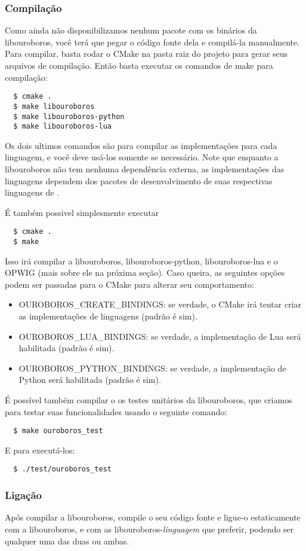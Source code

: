 \subsubsection{Compilação} 
Como ainda não disponibilizamos nenhum pacote
com os binários da libouroboros, você terá que pegar o código fonte dela
e compilá-la manualmente. Para compilar, basta rodar o CMake na pasta 
raiz do projeto para gerar seus arquivos de compilação. Então basta 
executar os comandos de make para compilação:
\begin{verbatim}
  $ cmake .
  $ make libouroboros
  $ make libouroboros-python
  $ make libouroboros-lua
\end{verbatim}
Os dois ultimos comandos são para compilar as implementações para cada linguagem,
e você deve usá-los somente se necessário. Note que enquanto a libouroboros não
tem nenhuma dependência externa, as implementações das linguagens dependem dos
pacotes de desenvolvimento de suas respectivas linguagens de \script{}.

É também possivel simplesmente executar
\begin{verbatim}
  $ cmake .
  $ make
\end{verbatim}
Isso irá compilar a libouroboros, libouroboros-python, libouroboros-lua e o OPWIG
(mais sobre ele na próxima seção). Caso queira, as seguintes opções podem ser
passadas para o CMake para alterar seu comportamento:
\begin{itemize}
  \item OUROBOROS\_CREATE\_BINDINGS: se verdade, o CMake irá tentar criar as 
    implementações de linguagens (padrão é sim).
  \item OUROBOROS\_LUA\_BINDINGS: se verdade, a implementação de Lua será habilitada (padrão é sim).
  \item OUROBOROS\_PYTHON\_BINDINGS: se verdade, a implementação de Python será habilitada (padrão é sim).
\end{itemize}

É possível também compilar o os testes unitários da libouroboros, que
criamos para testar suas funcionalidades usando o seguinte comando:
\begin{verbatim}
  $ make ouroboros_test
\end{verbatim}
E para executá-los:
\begin{verbatim}
  $ ./test/ouroboros_test
\end{verbatim}
    
\subsubsection{Ligação} 
Após compilar a libouroboros, compile o seu código fonte e ligue-o estaticamente
com a libouroboros, e com as libouroboros-\textit{linguagem} que preferir, podendo ser qualquer uma
das duas ou ambas.
    
